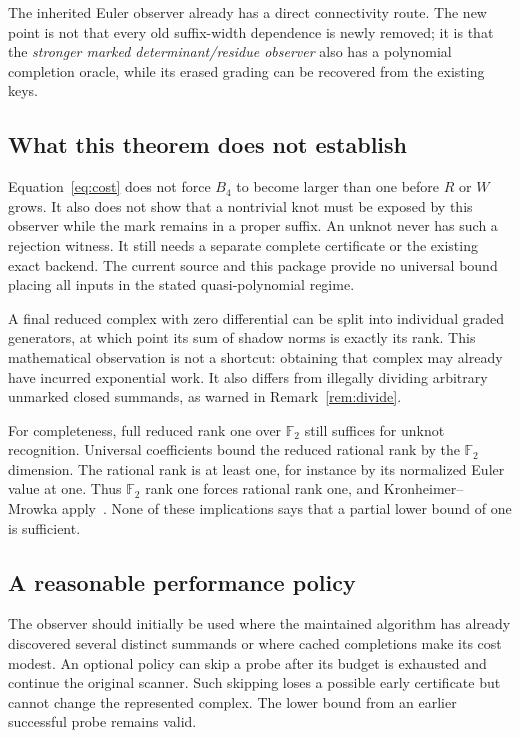 \documentclass[11pt]{article}
\theoremstyle{definition}
\theoremstyle{remark}
\newcommand{\F}{{\mathbb F_2}}
\begin{document}
The inherited Euler observer already has a direct connectivity route. The
new point is not that every old suffix-width dependence is newly removed;
it is that the \emph{stronger marked determinant/residue observer} also has
a polynomial completion oracle, while its erased grading can be recovered
from the existing keys.

\subsection{What this theorem does not establish}
Equation~\eqref{eq:cost} does not force $B_4$ to become larger than one before
$R$ or $W$ grows. It also does not show that a nontrivial knot must be exposed
by this observer while the mark remains in a proper suffix. An unknot never
has such a rejection witness. It still needs a separate complete certificate
or the existing exact backend. The current source and this package provide
no universal bound placing all inputs in the stated quasi-polynomial regime.

A final reduced complex with zero differential can be split into individual
graded generators, at which point its sum of shadow norms is exactly its
rank. This mathematical observation is not a shortcut: obtaining that
complex may already have incurred exponential work. It also differs from
illegally dividing arbitrary unmarked closed summands, as warned in
Remark~\ref{rem:divide}.

For completeness, full reduced rank one over $\F$ still suffices for
unknot recognition. Universal coefficients bound the reduced rational rank
by the $\F$ dimension. The rational rank is at least one, for instance by
its normalized Euler value at one. Thus $\F$ rank one forces rational rank
one, and Kronheimer--Mrowka apply~\cite{km}. None of these implications says
that a partial lower bound of one is sufficient.

\subsection{A reasonable performance policy}
The observer should initially be used where the maintained algorithm has
already discovered several distinct summands or where cached completions
make its cost modest. An optional policy can skip a probe after its budget
is exhausted and continue the original scanner. Such skipping loses a
possible early certificate but cannot change the represented complex.
The lower bound from an earlier successful probe remains valid.
\end{document}
